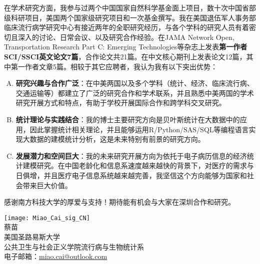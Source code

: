 \documentclass[11pt, a4paper]{article}
\begin{document}
在学术研究方面，我参与过两个中国国家自然科学基金面上项目，数十次中国省部级科研项目，美国两个国家级研究项目和一次基金撰写。我在美国退伍军人事务部临床流行病学研究中心有接近两年的全职研究经历，与各个学科的研究人员有着密切且深入的讨论、日常会议、以及研究合作经验。在JAMA Network Open, Transportation Research Part C: Emerging Technologies等杂志上发表\textbf{\textcolor{slublue}{第一作者SCI/SSCI英文论文7篇}}，合作论文共21篇。在中文核心期刊上发表论文12篇，其中第一作者文章5篇。相较于其它应聘者，我认为我有以下突出优势：
\vspace{-0.3\baselineskip}
\begin{enumerate}[(A)]
	\setlength{\parskip}{-0.2em}%
	\item \textbf{研究兴趣与合作广泛}：在中美两国以及多个学科（统计、经济、临床流行病、交通运输等）都建立了广泛的研究合作和学术联系，并且熟悉中美两国的学术研究开展方式和特点，有助于学校开展国际合作和跨学科交叉研究。
	\item \textbf{统计理论与实践结合}：我的博士主要研究方向是贝叶斯统计在大数据中的应用，因此掌握统计相关理论，并且能够运用R/Python/SAS/SQL等编程语言实现大数据的建模统计分析，这是未来特别有前景的研究方向。
	\item \textbf{发展潜力和空间巨大}：我的未来研究开展方向为依托于电子病历信息的经济统计建模研究。在中国老龄化和信息系速度越来越快的背景下，对医疗的需求与日俱增，并且医疗电子信息系统越来越完善，我坚信这个方向能够为国家和社会带来巨大价值。
\end{enumerate}



感谢南方科技大学的厚爱与支持！期待能有机会与大家在深圳合作和研究。



\vspace*{\fill}


\setlength{\parindent}{0pt}%
\begin{minipage}[c]{0.7\linewidth}
\texttt{[image: Miao\_Cai\_sig\_CN]}\\
蔡苗\\
美国圣路易斯大学\\
公共卫生与社会正义学院流行病与生物统计系\\
电子邮箱：\href{mailto:miao.cai@outlook.com}{miao.cai@outlook.com}
\end{minipage}
\hfill
\begin{minipage}[c]{0.3\linewidth}
\end{minipage}
\end{document}
